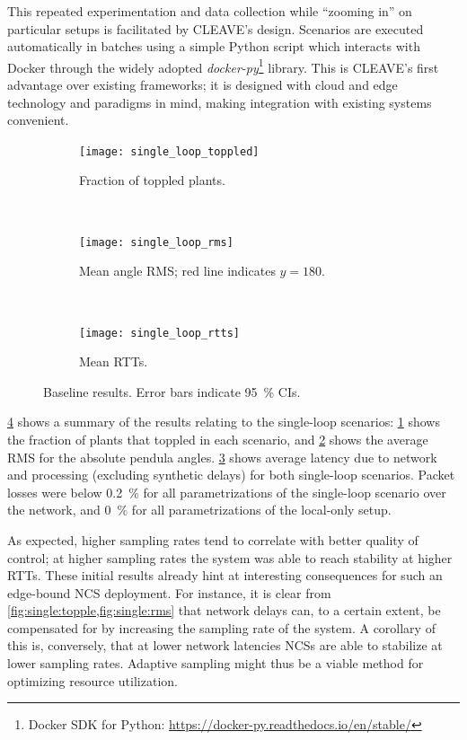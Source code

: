 This repeated experimentation and data collection while ``zooming in'' on particular setups is facilitated by \ac{CLEAVE}'s design.
Scenarios are executed automatically in batches using a simple Python script which interacts with Docker through the widely adopted \emph{docker-py}\footnote{Docker SDK for Python: \url{https://docker-py.readthedocs.io/en/stable/}} library.
This is \ac{CLEAVE}'s first advantage over existing frameworks; it is designed with cloud and edge technology and paradigms in mind, making integration with existing systems convenient.

\begin{figure}[t]
    \centering
    \begin{subfigure}[t]{\columnwidth}
        \centering
        \texttt{[image: single\_loop\_toppled]}
        \caption{Fraction of toppled plants.}\label{fig:single:topple}
    \end{subfigure}\\
    \begin{subfigure}[t]{\columnwidth}
        \centering
        \texttt{[image: single\_loop\_rms]}
        \caption{Mean angle \acs*{RMS}; red line indicates \( y = 180 \).}\label{fig:single:rms}
    \end{subfigure}\\
    \begin{subfigure}[t]{\columnwidth}
        \centering
        \texttt{[image: single\_loop\_rtts]}
        \caption{
            Mean \acsp*{RTT}.
        }\label{fig:single:rtt}
    \end{subfigure}%
    \caption[caption]{
        Baseline results.
        Error bars indicate \SI{95}{\percent} \acp{CI}.
        }%
    \label{fig:single}
\end{figure}

\cref{fig:single} shows a summary of the results relating to the single-loop scenarios:
\cref{fig:single:topple} shows the fraction of plants that toppled in each scenario, and \cref{fig:single:rms} shows the average \ac{RMS} for the absolute pendula angles.
\cref{fig:single:rtt} shows average latency due to network and processing (excluding synthetic delays) for both single-loop scenarios.
Packet losses were below \SI{0.2}{\percent} for all parametrizations of the single-loop scenario over the network, and \SI{0}{\percent} for all parametrizations of the local-only setup.

As expected, higher sampling rates tend to correlate with better quality of control; at higher sampling rates the system was able to reach stability at higher \acp{RTT}.
These initial results already hint at interesting consequences for such an edge-bound \ac{NCS} deployment.
For instance, it is clear from \cref{fig:single:topple,fig:single:rms} that network delays can, to a certain extent, be compensated for by increasing the sampling rate of the system.
A corollary of this is, conversely, that at lower network latencies \acp{NCS} are able to stabilize at lower sampling rates.
Adaptive sampling might thus be a viable method for optimizing resource utilization.

